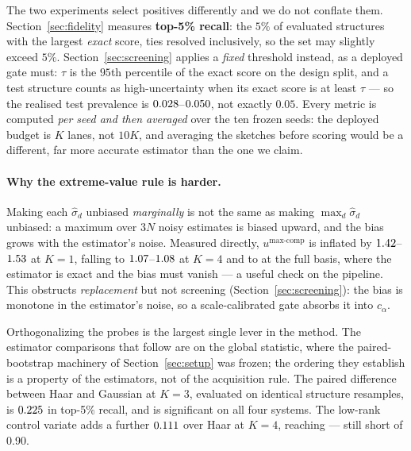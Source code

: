 \documentclass{article}
\begin{document}
The two experiments select positives differently and we do not conflate them.
Section~\ref{sec:fidelity} measures \textbf{top-5\% recall}: the $5\%$ of evaluated structures with
the largest \emph{exact} score, ties resolved inclusively, so the set may slightly exceed $5\%$.
Section~\ref{sec:screening} applies a \emph{fixed} threshold instead, as a deployed gate must:
$\tau$ is the $95$th percentile of the exact score on the design split, and a test structure counts
as high-uncertainty when its exact score is at least $\tau$ --- so the realised test prevalence is
$0.028$--$0.050$, not exactly $0.05$. Every metric is computed
\emph{per seed and then averaged} over the ten frozen seeds: the deployed budget is $K$ lanes, not
$10K$, and averaging the sketches before scoring would be a different, far more accurate estimator
than the one we claim.


\paragraph{Why the extreme-value rule is harder.}
Making each $\widehat\sigma_d$ unbiased \emph{marginally} is not the same as making
$\max_d\widehat\sigma_d$ unbiased: a maximum over $3N$ noisy estimates is biased upward, and the
bias grows with the estimator's noise. Measured directly, $u^{\max\text{-comp}}$ is inflated by
$1.42$--$1.53$ at $K{=}1$, falling to
$1.07$--$1.08$ at $K{=}4$ and to \fsMaxBiasExact{} at the full basis,
where the estimator is exact and the bias must vanish --- a useful check on the pipeline. This
obstructs \emph{replacement} but not screening (Section~\ref{sec:screening}): the bias is monotone
in the estimator's noise, so a scale-calibrated gate absorbs it into $c_\alpha$.

Orthogonalizing the probes is the largest single lever in the method. The estimator comparisons that
follow are on the global statistic, where the paired-bootstrap machinery of Section~\ref{sec:setup}
was frozen; the ordering they establish is a property of the estimators, not of the acquisition rule.
The paired difference between Haar and Gaussian at $K{=}3$, evaluated on identical structure
resamples, is
$0.225$ \fsDeltaOrthoCI{} in top-5\% recall, and is significant on all four systems. The
low-rank control variate adds a further $0.111$ \fsDeltaCVCI{} over Haar at $K{=}4$, reaching
\fsCVRecallKFour{} \fsCVRecallKFourCI{} --- still short of 0.90.
\end{document}
